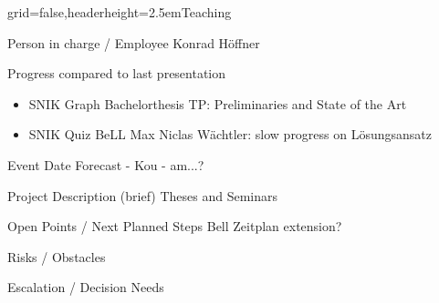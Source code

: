 \documentclass[]{kiesgrube}
\begin{document}
\begin{poster}%
{grid=false,headerheight=2.5em}{}{Teaching}{}

\begin{posterbox}[name=person,column=0,row=0]{Person in charge / Employee}
Konrad Höffner
\end{posterbox}
\begin{posterbox}[name=progress,below=person]{Progress compared to last presentation}
\begin{itemize}
\item SNIK Graph Bachelorthesis TP: Preliminaries and State of the Art
\item SNIK Quiz BeLL Max Niclas Wächtler: slow progress on Lösungsansatz
\end{itemize}
\end{posterbox}
\begin{posterbox}[name=event,below=progress]{Event Date Forecast}
- Kou
- am...?

\end{posterbox}
\begin{posterbox}[name=description,column=1,row=0]{Project Description (brief)}
Theses and Seminars
\end{posterbox}
\begin{posterbox}[name=open,column=1,below=description]{Open Points / Next Planned Steps}
Bell Zeitplan extension?
\end{posterbox}
\begin{posterbox}[name=risks,column=1,below=open]{Risks / Obstacles}
\end{posterbox}
\begin{posterbox}[name=escalation,column=1,below=risks]{Escalation / Decision Needs}
\end{posterbox}
\end{poster}
\end{document}
